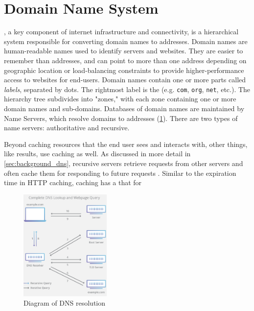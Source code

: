 \section{Domain Name System}\label{sec:background_dns}

\dns, a key component of internet infrastructure and connectivity, is a hierarchical system responsible for converting domain names to \ip addresses. Domain names are human-readable names used to identify servers and websites. They are easier to remember than \ip addresses, and can point to more than one address depending on geographic location or load-balancing constraints to provide higher-performance access to websites for end-users. Domain names contain one or more parts called \textit{labels}, separated by dots. The rightmost label is the \tld (e.g. \texttt{com}, \texttt{org}, \texttt{net}, etc.). The \dns hierarchy tree subdivides into "zones," with each zone containing one or more domain names and sub-domains. Databases of domain names are maintained by \dns Name Servers, which resolve domains to \ip addresses  (\cref{fig:dns_resolution}). There are two types of name servers: authoritative and recursive.

Beyond caching resources that the end user sees and interacts with, other things, like \dns results, use caching as well. As discussed in more detail in \autoref{sec:background_dns}, recursive \dns servers retrieve requests from other \dns servers and often cache them for responding to future requests \cite{rfc1035}. Similar to the expiration time  in HTTP caching, \dns caching has a \ttl that for

\begin{figure}
    \centering
    \includegraphics[width=0.4\textwidth]{images/other/dns_lookup_diagram.png}
    \caption{Diagram of DNS resolution \cite{Cloudflare2020a}}
    \label{fig:dns_resolution}
\end{figure}


